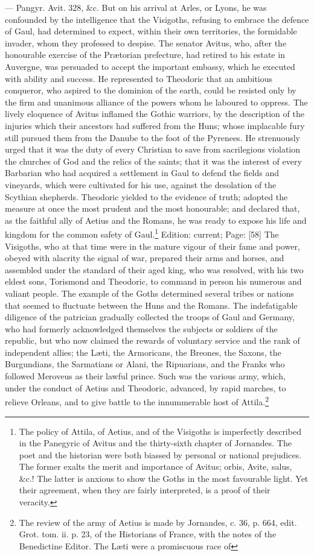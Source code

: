 {\texthebrew{—} Pangyr. Avit. 328, \&c.} But on his arrival at Arles, or Lyons, he was confounded by the intelligence that the Visigoths, refusing to embrace the defence of Gaul, had determined to expect, within their own territories, the formidable invader, whom they professed to despise. The senator Avitus, who, after the honourable exercise of the Prætorian prefecture, had retired to his estate in Auvergne, was persuaded to accept the important embassy, which he executed with ability and success. He represented to Theodoric that an ambitious conqueror, who aspired to the dominion of the earth, could be resisted only by the firm and unanimous alliance of the powers whom he laboured to oppress. The lively eloquence of Avitus inflamed the Gothic warriors, by the description of the injuries which their ancestors had suffered from the Huns; whose implacable fury still pursued them from the Danube to the foot of the Pyrenees. He strenuously urged that it was the duty of every Christian to save from sacrilegious violation the churches of God and the relics of the saints; that it was the interest of every Barbarian who had acquired a settlement in Gaul to defend the fields and vineyards, which were cultivated for his use, against the desolation of the Scythian shepherds. Theodoric yielded to the evidence of truth; adopted the measure at once the most prudent and the most honourable; and declared that, as the faithful ally of Aetius and the Romans, he was ready to expose his life and kingdom for the common safety of Gaul.\footnote{The policy of Attila, of Aetius, and of the Visigoths is imperfectly described in the Panegyric of Avitus and the thirty-sixth chapter of Jornandes. The poet and the historian were both biassed by personal or national prejudices. The former exalts the merit and importance of Avitus; orbis, Avite, salus, \&c.! The latter is anxious to show the Goths in the most favourable light. Yet their agreement, when they are fairly interpreted, is a proof of their veracity.} Edition: current; Page: [58] The Visigoths, who at that time were in the mature vigour of their fame and power, obeyed with alacrity the signal of war, prepared their arms and horses, and assembled under the standard of their aged king, who was resolved, with his two eldest sons, Torismond and Theodoric, to command in person his numerous and valiant people. The example of the Goths determined several tribes or nations that seemed to fluctuate between the Huns and the Romans. The indefatigable diligence of the patrician gradually collected the troops of Gaul and Germany, who had formerly acknowledged themselves the subjects or soldiers of the republic, but who now claimed the rewards of voluntary service and the rank of independent allies; the Læti, the Armoricans, the Breones, the Saxons, the Burgundians, the Sarmatians or Alani, the Ripuarians, and the Franks who followed Meroveus as their lawful prince. Such was the various army, which, under the conduct of Aetius and Theodoric, advanced, by rapid marches, to relieve Orleans, and to give battle to the innummerable host of Attila.\footnote{The review of the army of Aetius is made by Jornandes, c. 36, p. 664, edit. Grot. tom. ii. p. 23, of the Historians of France, with the notes of the Benedictine Editor. The Læti were a promiscuous race of }
